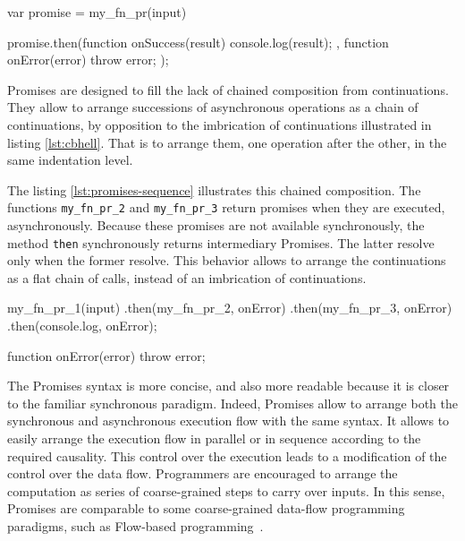 \begin{code}[js, %
             caption={Example of a promise}, %
             label={lst:then}] %
var promise = my_fn_pr(input)

promise.then(function onSuccess(result) {
  console.log(result);
}, function onError(error) {
  throw error;
});
\end{code}

Promises are designed to fill the lack of chained composition from continuations.
They allow to arrange successions of asynchronous operations as a chain of continuations, by opposition to the imbrication of continuations illustrated in listing \ref{lst:cbhell}.
That is to arrange them, one operation after the other, in the same indentation level.

The listing \ref{lst:promises-sequence} illustrates this chained composition.
The functions \texttt{my_fn_pr_2} and \texttt{my_fn_pr_3} return promises when they are executed, asynchronously.
Because these promises are not available synchronously, the method \texttt{then} synchronously returns intermediary Promises.
The latter resolve only when the former resolve.
This behavior allows to arrange the continuations as a flat chain of calls, instead of an imbrication of continuations.

\begin{code}[js, %
             caption={A chain of Promises is more concise than an imbrication of continuations}, %
             label={lst:promises-sequence}] %
my_fn_pr_1(input)
.then(my_fn_pr_2, onError)
.then(my_fn_pr_3, onError)
.then(console.log, onError);

function onError(error) {
  throw error;
}
\end{code}

The Promises syntax is more concise, and also more readable because it is closer to the familiar synchronous paradigm.
Indeed, Promises allow to arrange both the synchronous and asynchronous execution flow with the same syntax.
It allows to easily arrange the execution flow in parallel or in sequence according to the required causality.
This control over the execution leads to a modification of the control over the data flow.
Programmers are encouraged to arrange the computation as series of coarse-grained steps to carry over inputs.
In this sense, Promises are comparable to some coarse-grained data-flow programming paradigms, such as Flow-based programming~\cite{Morrison1994}.

